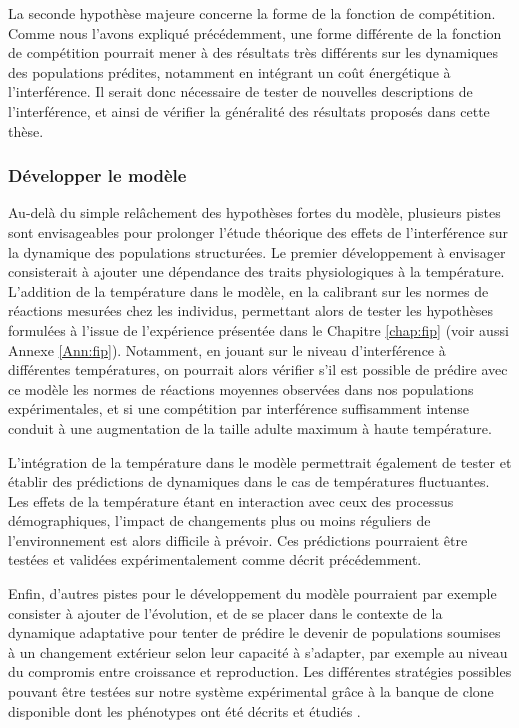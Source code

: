 La seconde hypothèse majeure concerne la forme de la fonction de compétition.
Comme nous l'avons expliqué précédemment, une forme différente de la fonction de
compétition pourrait mener à des résultats très différents sur les dynamiques
des populations prédites, notamment en intégrant un coût énergétique à
l'interférence. Il serait donc nécessaire de tester de nouvelles descriptions
de l'interférence, et ainsi de vérifier la généralité des résultats proposés
dans cette thèse.

\subsubsection{Développer le modèle}

Au-delà du simple relâchement des hypothèses fortes du modèle, plusieurs pistes
sont envisageables pour prolonger l'étude théorique des effets de
l'interférence sur la dynamique des populations structurées. Le premier développement à
envisager consisterait à ajouter une dépendance des traits physiologiques à la
température. L'addition de la température dans le modèle, en la calibrant sur
les normes de réactions mesurées chez les individus, permettant alors de tester
les hypothèses formulées à l'issue de l'expérience présentée dans le Chapitre
\ref{chap:fip} (voir aussi Annexe \ref{Ann:fip}). Notamment, en jouant sur le
niveau d'interférence à différentes températures, on pourrait alors vérifier
s'il est possible de prédire avec ce modèle les normes de réactions moyennes
observées dans nos populations expérimentales, et si une compétition
par interférence suffisamment intense conduit à une augmentation de la taille
adulte maximum à haute température.

L'intégration de la température dans le modèle permettrait également de tester
et établir des prédictions de dynamiques dans le cas de températures
fluctuantes. Les effets de la température étant en interaction avec ceux des
processus démographiques, l'impact de changements plus ou moins réguliers de
l'environnement est alors difficile à prévoir. Ces prédictions pourraient être
testées et validées expérimentalement comme décrit précédemment.

Enfin, d'autres pistes pour le développement du modèle pourraient par exemple
consister à ajouter de l'évolution, et de se placer dans le contexte de la
dynamique adaptative pour tenter de prédire le devenir de populations soumises à
un changement extérieur selon leur capacité à s'adapter, par exemple au niveau
du compromis entre croissance et reproduction. Les différentes stratégies
possibles pouvant être testées sur notre système expérimental grâce à la banque
de clone disponible dont les phénotypes ont été décrits et étudiés
\autocites{tully2004a}. 

